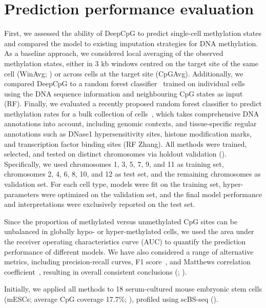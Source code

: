 \section{Prediction performance evaluation} \label{sec:dcpg_eval}

First, we assessed the ability of DeepCpG to predict single-cell methylation states and compared the model to existing imputation strategies for DNA methylation. As a baseline approach, we considered local averaging of the observed methylation states, either in 3 kb windows centred on the target site of the same cell (WinAvg; ) or across cells at the target site (CpGAvg). Additionally, we compared DeepCpG to a random forest classifier~\citep{breiman_random_2001} trained on individual cells using the DNA sequence information and neighbouring CpG states as input (RF). Finally, we evaluated a recently proposed random forest classifier to predict methylation rates for a bulk collection of cells~\citep{zhang_predicting_2015}, which takes comprehensive DNA annotations into account, including genomic contexts, and tissue-specific regular annotations such as DNase1 hypersensitivity sites, histone modification marks, and transcription factor binding sites (RF Zhang). All methods were trained, selected, and tested on distinct chromosomes via holdout validation (). Specifically, we used chromosomes 1, 3, 5, 7, 9, and 11 as training set, chromosomes 2, 4, 6, 8, 10, and 12 as test set, and the remaining chromosomes as validation set. For each cell type, models were fit on the training set, hyper-parameters were optimized on the validation set, and the final model performance and interpretations were exclusively reported on the test set.

Since the proportion of methylated versus unmethylated CpG sites can be unbalanced in globally hypo- or hyper-methylated cells, we used the area under the receiver operating characteristics curve (AUC) to quantify the prediction performance of different models. We have also considered a range of alternative metrics, including precision-recall curves, F1 score~\citep{powers_evaluation:_2011}, and Matthews correlation coefficient~\citep{matthews_comparison_1975}, resulting in overall consistent conclusions (; ).

Initially, we applied all methods to 18 serum-cultured mouse embryonic stem cells (mESCs; average CpG coverage 17.7\%; ), profiled using scBS-seq ().

